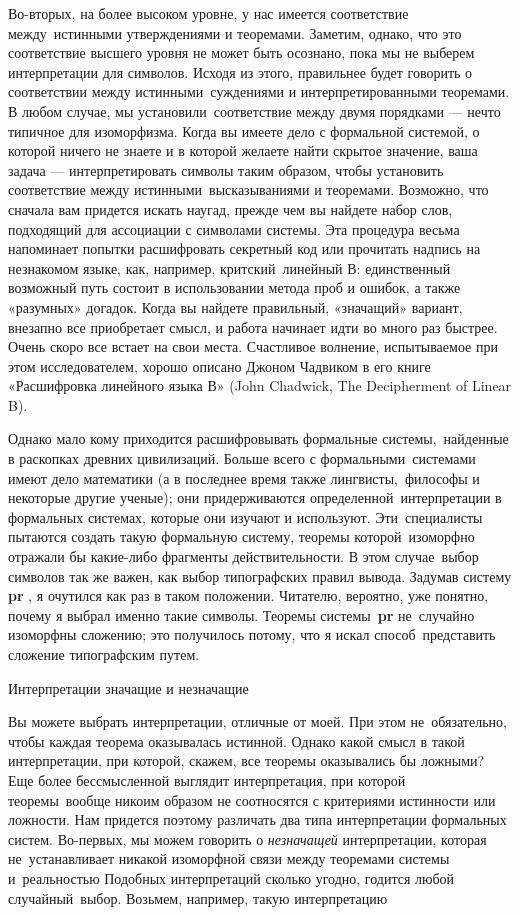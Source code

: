 Во-вторых, на более высоком уровне, у нас имеется соответствие между~истинными утверждениями и теоремами. Заметим, однако, что это соответствие высшего уровня не может быть осознано, пока мы не выберем интерпретации для символов. Исходя из этого, правильнее будет говорить о соответствии между истинными~суждениями и интерпретированными теоремами. В любом случае, мы установили~соответствие между двумя порядками --- нечто типичное для изоморфизма. Когда вы имеете дело с формальной системой, о которой ничего не знаете и в которой желаете найти скрытое значение, ваша задача --- интерпретировать символы таким образом, чтобы установить соответствие между истинными~высказываниями и теоремами. Возможно, что сначала вам придется искать наугад, прежде чем вы найдете набор слов, подходящий для ассоциации с символами системы. Эта процедура весьма напоминает попытки расшифровать секретный код или прочитать надпись на незнакомом языке, как, например, критский~линейный В: единственный возможный путь состоит в использовании метода проб и ошибок, а также «разумных» догадок. Когда вы найдете правильный, «значащий» вариант, внезапно все приобретает смысл, и работа начинает идти во много раз быстрее. Очень скоро все встает на свои места. Счастливое волнение, испытываемое при этом исследователем, хорошо описано Джоном Чадвиком в его книге «Расшифровка линейного языка В» (John Chadwick, The Decipherment of Linear B).

Однако мало кому приходится расшифровывать формальные системы,~найденные в раскопках древних цивилизаций. Больше всего с формальными~системами имеют дело математики (а в последнее время также лингвисты,~философы и некоторые другие ученые); они придерживаются определенной~интерпретации в формальных системах, которые они изучают и используют. Эти~специалисты пытаются создать такую формальную систему, теоремы которой~изоморфно отражали бы какие-либо фрагменты действительности. В этом случае~выбор символов так же важен, как выбор типографских правил вывода. Задумав систему \textbf{pr} , я очутился как раз в таком положении. Читателю, вероятно, уже понятно, почему я выбрал именно такие символы. Теоремы системы~\textbf{pr} не~случайно изоморфны сложению; это получилось потому, что я искал способ~представить сложение типографским путем.

Интерпретации значащие и незначащие

Вы можете выбрать интерпретации, отличные от моей. При этом не~обязательно, чтобы каждая теорема оказывалась истинной. Однако какой смысл в такой интерпретации, при которой, скажем, все теоремы оказывались бы ложными? Еще более бессмысленной выглядит интерпретация, при которой теоремы~вообще никоим образом не соотносятся с критериями истинности или ложности. Нам придется поэтому различать два типа интерпретации формальных систем. Во-первых, мы можем говорить о \emph{незначащей} интерпретации, которая не~устанавливает никакой изоморфной связи между теоремами системы и~реальностью Подобных интерпретаций сколько угодно, годится любой случайный~выбор. Возьмем, например, такую интерпретацию


